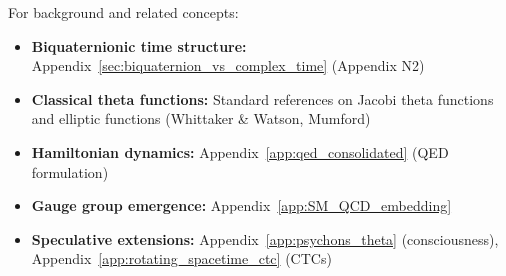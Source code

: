 For background and related concepts:
\begin{itemize}
\item \textbf{Biquaternionic time structure:} Appendix~\ref{sec:biquaternion_vs_complex_time} (Appendix N2)
\item \textbf{Classical theta functions:} Standard references on Jacobi theta functions and elliptic functions (Whittaker \& Watson, Mumford)
\item \textbf{Hamiltonian dynamics:} Appendix~\ref{app:qed_consolidated} (QED formulation)
\item \textbf{Gauge group emergence:} Appendix~\ref{app:SM_QCD_embedding}
\item \textbf{Speculative extensions:} Appendix~\ref{app:psychons_theta} (consciousness), Appendix~\ref{app:rotating_spacetime_ctc} (CTCs)
\end{itemize}
